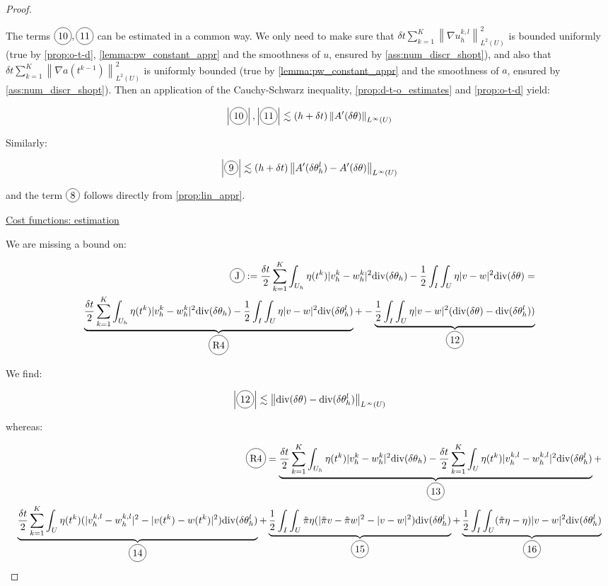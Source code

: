 \documentclass[english,a4paper,9pt,oneside]{scrbook}	%
\theoremstyle{break}
\newenvironment{mproof}[1][\proofname]{%
  \begin{proof}[#1]$ $\par\nobreak\ignorespaces
}{%
  \end{proof}
}
\renewcommand*{\proofname}{Proof}
\theoremstyle{remark}
\newcommand{\ds}{\displaystyle}
\newcommand{\norm}[1]{\left\lVert#1\right\rVert}
\newcommand{\te}{\theta}
\newcommand{\dive}{\text{div}}
\newcommand*\circled[1]{\tikz[baseline=(char.base)]{
            \node[shape=circle,draw,inner sep=2pt] (char) {#1};}}
\begin{document}
\begin{mproof}
The terms $\circled{10}, \circled{11}$ can be estimated in a common way. We only need to make sure that $\ds \delta t \sum_{k=1}^{K} \norm{\nabla u_h^{k,l}}_{L^2(U)}^2 $ is bounded uniformly (true by \cref{prop:o-t-d}, \cref{lemma:pw_constant_appr} and the smoothness of $u$, ensured by \cref{ass:num_discr_shopt}), and also that $\ds \delta t \sum_{k=1}^{K} \norm{\nabla a(t^{k-1})}_{L^2(U)}^2$ is uniformly bounded (true by \cref{lemma:pw_constant_appr} and the smoothness of $a$, ensured by \cref{ass:num_discr_shopt}). Then an application of the Cauchy-Schwarz inequality, \cref{prop:d-t-o_estimates} and \cref{prop:o-t-d} yield:

\begin{align*}
	\left | \circled{10} \right |, \left |\circled{11}\right | \lesssim (h+\delta t) \norm{A'(\delta \te)}_{L^\infty(U)}
\end{align*}

Similarly:

\begin{align*}
	\left | \circled{9} \right | \lesssim (h+\delta t) \norm{A'(\delta \te_h^l)-A'(\delta \te)}_{L^\infty(U)}
\end{align*}

and the term $\circled{8}$ follows directly from \cref{prop:lin_appr}.

\underline{Cost functions: estimation}

We are missing a bound on: 

\begin{align*}
	\circled{J}:=\frac{\delta t}{2} \sum_{k=1}^{K} \int_{U_h} \eta(t^k)|v_h^k-w_h^k|^2  \dive(\delta \theta_h ) - \frac{1}{2}\int_I\int_{U}\eta |v-w|^2\dive(\delta \te) = \\
	\underbrace{\frac{\delta t}{2} \sum_{k=1}^{K} \int_{U_h} \eta(t^k)|v_h^k-w_h^k|^2  \dive(\delta \theta_h ) - \frac{1}{2}\int_I\int_{U}\eta |v-w|^2\dive(\delta \te_h^l)}_{\circled{R4}}+
	-\underbrace{ \frac{1}{2}\int_I\int_{U}\eta |v-w|^2(\dive(\delta \te) - \dive(\delta \te_h^l))}_{\circled{12}}
\end{align*}

We find:

\begin{align*}
	\left | \circled{12} \right | \lesssim \norm{\dive(\delta \te) - \dive(\delta \te_h^l)}_{L^\infty(U)}
\end{align*}

whereas:

\begin{align*}
\circled{R4} =\underbrace{ \frac{\delta t}{2} \sum_{k=1}^{K} \int_{U_h} \eta(t^k)|v_h^k-w_h^k|^2  \dive(\delta \theta_h ) - \frac{\delta t}{2} \sum_{k=1}^{K}\int_{U} \eta(t^k) |v_h^{k,l}-w_h^{k,l}|^2\dive(\delta \te_h^l)}_{\circled{13}}+\\
\underbrace{\frac{\delta t}{2} \sum_{k=1}^{K}\int_{U} \eta(t^k) (|v_h^{k,l}-w_h^{k,l}|^2- |v(t^k)-w(t^k)|^2)\dive(\delta \te_h^l)}_{\circled{14}}+
\underbrace{\frac{1}{2}\int_I\int_{U}\tilde{\pi} \eta (|\tilde{\pi} v-\tilde{\pi} w|^2-|v-w|^2)\dive(\delta \te_h^l)}_{\circled{15}}+
\underbrace{\frac{1}{2}\int_I\int_{U}(\tilde{\pi} \eta - \eta) |v-w|^2\dive(\delta \te_h^l)}_{\circled{16}}
\end{align*}


\end{mproof}
\end{document}
